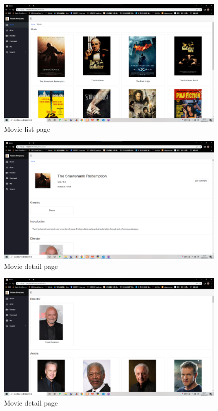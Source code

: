 \begin{CJK*}{UTF8}{gbsn}
    \begin{figure}[htbp]
    \centering
    \includegraphics[width=1\textwidth]{res_movie1.png}
    \caption{Movie list page}
    \end{figure}
    
    \begin{figure}[htbp]
    \centering
    \includegraphics[width=1\textwidth]{res_movie2.png}
    \caption{Movie detail page}
    \end{figure}
    
    \begin{figure}[htbp]
    \centering
    \includegraphics[width=1\textwidth]{res_movie3.png}
    \caption{Movie detail page}
    \end{figure}
    

\end{CJK*}
